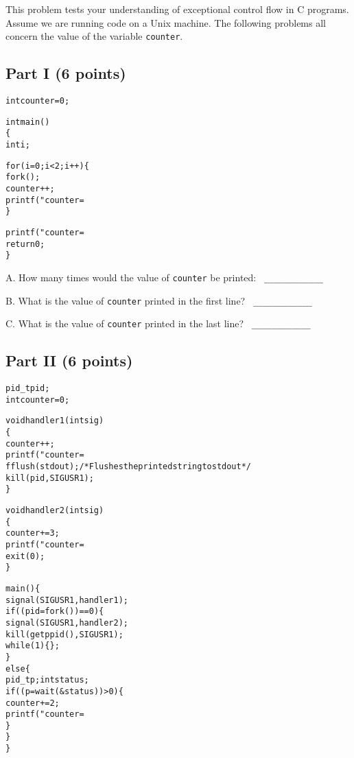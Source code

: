 \begin{problem}{16}

This problem tests your understanding of exceptional control flow in C
programs. Assume we are running code on a Unix machine. The following
problems all concern the value of the variable {\tt counter}.

\end{problem}

\subsection*{Part I (6 points)}

\begin{ccode}
\begin{alltt}
int counter = 0;

int  main()
\verb:{:
    int i;
    
    for (i = 0; i < 2; i ++)\verb:{:
        fork();
        counter ++;
        printf("counter = %d\verb:\n:", counter);
    \verb:}:
    
    printf("counter = %d\verb:\n:", counter);
    return 0;
\verb:}:
\end{alltt}
\end{ccode}

\vspace{0.30in}

A. How many times would the value of {\tt counter} be printed: \verb| ____________| 

\vspace{0.25in}

B. What is the value of {\tt counter} printed in the first line?  \verb| ____________| 

\vspace{0.25in}

C. What is the value of {\tt counter} printed in the last line? \verb| ____________| 

\newpage
\subsection*{Part II (6 points)}
\begin{ccode}
\begin{alltt}
pid_t pid;
int counter = 0;

void handler1(int sig) 
\verb:{:
    counter ++;
    printf("counter = %d\verb:\n:", counter);
    fflush(stdout);   /* Flushes the printed string to stdout */
    kill(pid, SIGUSR1);
\verb:}:

void handler2(int sig) 
\verb:{:
    counter += 3;
    printf("counter = %d\verb:\n:", counter);
    exit(0);
\verb:}:

main() \verb:{:
    signal(SIGUSR1, handler1);
    if ((pid = fork()) == 0) \verb:{:
        signal(SIGUSR1, handler2);
        kill(getppid(), SIGUSR1);
        while(1) \verb:{:\verb:}:;
    \verb:}:
    else \verb:{:
        pid_t p; int status;
        if ((p = wait(&status)) > 0) \verb:{:
            counter += 2;
            printf("counter = %d\verb:\n:", counter);
        \verb:}:
    \verb:}:
\verb:}:
\end{alltt}
\end{ccode}

